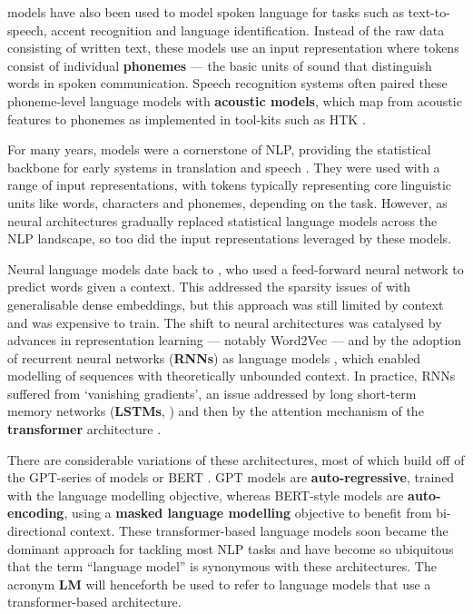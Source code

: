 \ngram models have also been used to model spoken language for tasks such as text-to-speech, accent recognition and language identification. Instead of the raw data consisting of written text, these models use an input representation where tokens consist of individual \textbf{phonemes} --- the basic units of sound that distinguish words in spoken communication. Speech recognition systems often paired these phoneme-level language models with \textbf{acoustic models}, which map from acoustic features to phonemes as implemented in tool-kits such as HTK \citep{young2006htk}.

For many years, \ngram models were a cornerstone of NLP, providing the statistical backbone for early systems in translation and speech \citep{jurafsky2009speech}. They were used with a range of input representations, with tokens typically representing core linguistic units like words, characters and phonemes, depending on the task. However, as neural architectures gradually replaced statistical language models across the NLP landscape, so too did the input representations leveraged by these models.

Neural language models date back to \citet{bengio2003neural}, who used a feed-forward neural network to predict words given a context. This addressed the sparsity issues of \ngrams with generalisable dense embeddings, but this approach was still limited by context and was expensive to train. The shift to neural architectures was catalysed by advances in representation learning — notably Word2Vec \citep{mikolov_distributed_2013} — and by the adoption of recurrent neural networks (\textbf{RNNs}) as language models \citep{mikolov2010recurrent}, which enabled modelling of sequences with theoretically unbounded context. In practice, RNNs suffered from `vanishing gradients', an issue addressed by long short-term memory networks (\textbf{LSTMs}, \citet{sundermeyer2012lstm}) and then by the attention mechanism of the \textbf{transformer} architecture \citep{vaswani2017attention}.

There are considerable variations of these architectures, most of which build off of the GPT-series of models \citep{radford2018gpt1,radford-2019-gpt2, brown2020gpt3} or BERT \citep{devlin2019bert}. GPT models are \textbf{auto-regressive}, trained with the language modelling objective, whereas BERT-style models are \textbf{auto-encoding}, using a \textbf{masked language modelling} objective to benefit from bi-directional context. These transformer-based language models soon became the dominant approach for tackling most NLP tasks and have become so ubiquitous that the term ``language model'' is synonymous with these architectures. The acronym \textbf{LM} will henceforth be used to refer to language models that use a transformer-based architecture.


